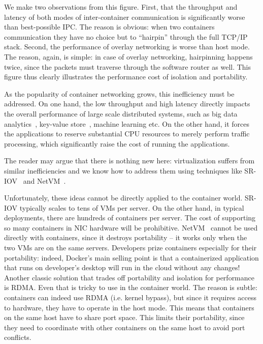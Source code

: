 We make two observations from this figure. First, that the throughput and
latency of both modes of inter-container communication is significantly worse
than best-possible IPC. The reason is obvious: when two containers communication
they have no choice but to ``hairpin'' through the full TCP/IP stack. Second,
the performance of overlay networking is worse than host mode. The reason, again,
is simple: in case of overlay networking, hairpinning happens twice, since the
packets must traverse through the software router as well. This figure thus
clearly illustrates the performance cost of isolation and portability.

As the popularity of container networking grows, this inefficiency must be
addressed. On one hand, the low throughput and high latency directly impacts
the overall performance of large scale distributed systems, such as big data
analytics~\cite{choudhury-paper}, key-value store~\cite{farm}, machine learning
etc.  On the other hand, it forces the applications to reserve substantial CPU
resources to merely perform traffic processing, which significantly raise the
cost of running the applications.

The reader may argue that there is nothing new here: virtualization suffers from
similar inefficiencies and we know how to address them using techniques like
SR-IOV~\cite{sriov} and NetVM~\cite{netvm}.

Unfortunately, these ideas cannot be directly applied to the container world.
SR-IOV typically scales to tens of VMs per server. On the other hand, in typical
deployments, there are hundreds of containers per server. The cost of supporting
so many containers in NIC hardware will be prohibitive. NetVM~\cite{netvm}
cannot be used directly with containers, since it destroys portability -- it
works only when the two VMs are on the same servers. Developers prize containers
especially for their portability: indeed, Docker's main selling point is that a
containerized application that runs on developer's desktop will run in the cloud
without any changes! Another classic solution that trades off portability and
isolation for performance is RDMA. Even that is tricky to use in the container
world. The reason is subtle: containers can indeed use RDMA (i.e. kernel
bypass), but since it requires access to hardware, they have to operate in the
host mode. This means that containers on the same host have to share port space.
This limits their portability, since they need to coordinate with other
containers on the same host to avoid port conflicts.

